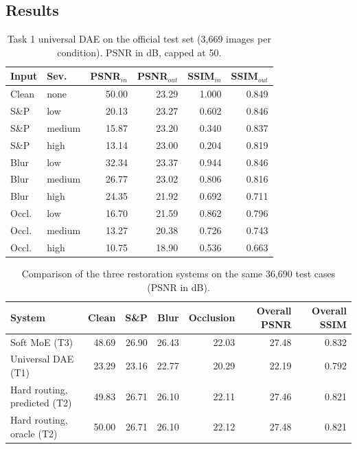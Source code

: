 \documentclass[conference]{IEEEtran}
\begin{document}
\subsection{Results}
\begin{table}[t]\centering\caption{Task 1 universal DAE on the official test set (3{,}669 images per condition). PSNR in dB, capped at 50.}\label{tab:t1}\setlength{\tabcolsep}{4pt}
\begin{tabular}{llrrrr}\toprule
Input & Sev. & PSNR$_{in}$ & PSNR$_{out}$ & SSIM$_{in}$ & SSIM$_{out}$\\ \midrule
Clean & none & 50.00 & 23.29 & 1.000 & 0.849 \\
S\&P & low & 20.13 & 23.27 & 0.602 & 0.846 \\
S\&P & medium & 15.87 & 23.20 & 0.340 & 0.837 \\
S\&P & high & 13.14 & 23.00 & 0.204 & 0.819 \\
Blur & low & 32.34 & 23.37 & 0.944 & 0.846 \\
Blur & medium & 26.77 & 23.02 & 0.806 & 0.816 \\
Blur & high & 24.35 & 21.92 & 0.692 & 0.711 \\
Occl. & low & 16.70 & 21.59 & 0.862 & 0.796 \\
Occl. & medium & 13.27 & 20.38 & 0.726 & 0.743 \\
Occl. & high & 10.75 & 18.90 & 0.536 & 0.663 \\
\bottomrule\end{tabular}\end{table}
\begin{table}[t]\centering\caption{Comparison of the three restoration systems on the same 36{,}690 test cases (PSNR in dB).}\label{tab:cmp}
\begin{tabular}{lrrrrrr}\toprule
System & Clean & S\&P & Blur & Occlusion & Overall PSNR & Overall SSIM\\ \midrule
Soft MoE (T3) & 48.69 & 26.90 & 26.43 & 22.03 & 27.48 & 0.832 \\
Universal DAE (T1) & 23.29 & 23.16 & 22.77 & 20.29 & 22.19 & 0.792 \\
Hard routing, predicted (T2) & 49.83 & 26.71 & 26.10 & 22.11 & 27.46 & 0.821 \\
Hard routing, oracle (T2) & 50.00 & 26.71 & 26.10 & 22.12 & 27.48 & 0.821 \\
\bottomrule\end{tabular}\end{table}
\end{document}
